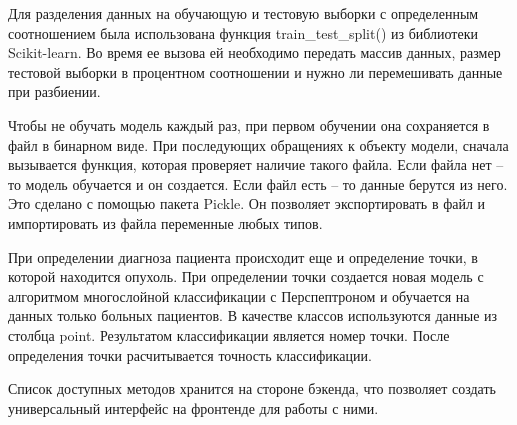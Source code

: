 Для разделения данных на обучающую и тестовую выборки с определенным соотношением была использована функция train\_test\_split() из библиотеки Scikit-learn. Во время ее вызова ей необходимо передать массив данных, размер тестовой выборки в процентном соотношении и нужно ли перемешивать данные при разбиении.
\par
Чтобы не обучать модель каждый раз, при первом обучении она сохраняется в файл в бинарном виде. При последующих обращениях к объекту модели, сначала вызывается функция, которая проверяет наличие такого файла. Если файла нет -- то модель обучается и он создается. Если файл есть -- то данные берутся из него. Это сделано с помощью пакета Pickle. Он позволяет экспортировать в файл и импортировать из файла переменные любых типов.
\par
При определении диагноза пациента происходит еще и определение точки, в которой находится опухоль. При определении точки создается новая модель с алгоритмом многослойной классификации с Перспептроном и обучается на данных только больных пациентов. В качестве классов используются данные из столбца point. Результатом классификации является номер точки. После определения точки расчитывается точность классификации.
\par
Список доступных методов хранится на стороне бэкенда, что позволяет создать универсальный интерфейс на фронтенде для работы с ними.

